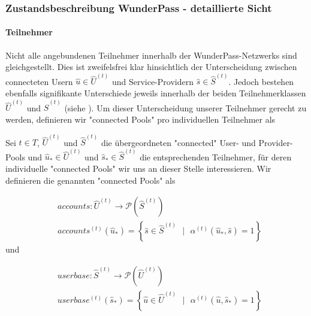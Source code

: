 \subsubsection{Zustandsbeschreibung WunderPass - detaillierte Sicht}
\label{sec:eco_zahlen_zustand_wp_advanced}


\paragraph{Teilnehmer} 
\label{sec:eco_zahlen_zustand_wp_advanced_teilnehmer}
\textrm{ }

\vspace{0.3cm}

Nicht alle angebundenen Teilnehmer innerhalb der WunderPass-Netzwerks sind gleichgestellt. Dies ist zweifelsfrei klar hinsichtlich der Unterscheidung zwischen connecteten Usern $\widehat{u} \in \widehat{U}^{(t)}$ und Service-Providern $\widehat{s} \in \widehat{S}^{(t)}$. Jedoch bestehen ebenfalls signifikante Unterschiede jeweils innerhalb der beiden Teilnehmerklassen $\widehat{U}^{(t)}$ und $\widehat{S}^{(t)}$ (siehe ). Um dieser Unterscheidung unserer Teilnehmer gerecht zu werden, definieren wir "connected Pools" pro individuellen Teilnehmer als

\vspace{0.3cm}

\begin{Def}\label{defTeilnehmerPool}

Sei $t \in T$, $\widehat{U}^{(t)}$ und $\widehat{S}^{(t)}$ die übergeordneten "connected" User- und Provider-Pools und $\widehat{u}_{*} \in \widehat{U}^{(t)}$ und $\widehat{s}_{*} \in \widehat{S}^{(t)}$ die entsprechenden Teilnehmer, für deren individuelle "connected Pools" wir uns an dieser Stelle interessieren. Wir definieren die genannten "connected Pools" als

\begin{align*}
&accounts : \widehat{U}^{(t)} \rightarrow \mathcal{P}\left(\widehat{S}^{(t)}\right) \\
&accounts^{(t)}(\widehat{u}_{*}) = \left\{\widehat{s} \in \widehat{S}^{(t)} \textrm{ } | \textrm{ } \alpha^{(t)}(\widehat{u}_{*}, \widehat{s}) = 1 \right\}
\end{align*}
und

\begin{align*}
&userbase : \widehat{S}^{(t)} \rightarrow \mathcal{P}\left(\widehat{U}^{(t)}\right) \\
&userbase^{(t)}(\widehat{s}_{*}) = \left\{\widehat{u} \in \widehat{U}^{(t)} \textrm{ } | \textrm{ } \alpha^{(t)}(\widehat{u}, \widehat{s}_{*}) = 1 \right\}
\end{align*}

\end{Def}

